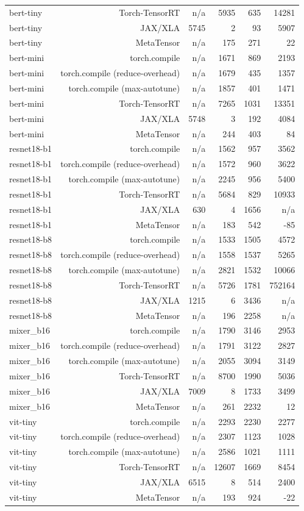 \begin{tabular}{lrrrrr}
bert-tiny & Torch-TensorRT & n/a & 5935 & 635 & 14281 \\
bert-tiny & JAX/XLA & 5745 & 2 & 93 & 5907 \\
bert-tiny & MetaTensor & n/a & 175 & 271 & 22 \\
bert-mini & torch.compile & n/a & 1671 & 869 & 2193 \\
bert-mini & torch.compile (reduce-overhead) & n/a & 1679 & 435 & 1357 \\
bert-mini & torch.compile (max-autotune) & n/a & 1857 & 401 & 1471 \\
bert-mini & Torch-TensorRT & n/a & 7265 & 1031 & 13351 \\
bert-mini & JAX/XLA & 5748 & 3 & 192 & 4084 \\
bert-mini & MetaTensor & n/a & 244 & 403 & 84 \\
resnet18-b1 & torch.compile & n/a & 1562 & 957 & 3562 \\
resnet18-b1 & torch.compile (reduce-overhead) & n/a & 1572 & 960 & 3622 \\
resnet18-b1 & torch.compile (max-autotune) & n/a & 2245 & 956 & 5400 \\
resnet18-b1 & Torch-TensorRT & n/a & 5684 & 829 & 10933 \\
resnet18-b1 & JAX/XLA & 630 & 4 & 1656 & n/a \\
resnet18-b1 & MetaTensor & n/a & 183 & 542 & -85 \\
resnet18-b8 & torch.compile & n/a & 1533 & 1505 & 4572 \\
resnet18-b8 & torch.compile (reduce-overhead) & n/a & 1558 & 1537 & 5265 \\
resnet18-b8 & torch.compile (max-autotune) & n/a & 2821 & 1532 & 10066 \\
resnet18-b8 & Torch-TensorRT & n/a & 5726 & 1781 & 752164 \\
resnet18-b8 & JAX/XLA & 1215 & 6 & 3436 & n/a \\
resnet18-b8 & MetaTensor & n/a & 196 & 2258 & n/a \\
mixer\_b16 & torch.compile & n/a & 1790 & 3146 & 2953 \\
mixer\_b16 & torch.compile (reduce-overhead) & n/a & 1791 & 3122 & 2827 \\
mixer\_b16 & torch.compile (max-autotune) & n/a & 2055 & 3094 & 3149 \\
mixer\_b16 & Torch-TensorRT & n/a & 8700 & 1990 & 5036 \\
mixer\_b16 & JAX/XLA & 7009 & 8 & 1733 & 3499 \\
mixer\_b16 & MetaTensor & n/a & 261 & 2232 & 12 \\
vit-tiny & torch.compile & n/a & 2293 & 2230 & 2277 \\
vit-tiny & torch.compile (reduce-overhead) & n/a & 2307 & 1123 & 1028 \\
vit-tiny & torch.compile (max-autotune) & n/a & 2586 & 1021 & 1111 \\
vit-tiny & Torch-TensorRT & n/a & 12607 & 1669 & 8454 \\
vit-tiny & JAX/XLA & 6515 & 8 & 514 & 2400 \\
vit-tiny & MetaTensor & n/a & 193 & 924 & -22 \\
\bottomrule
\end{tabular}
